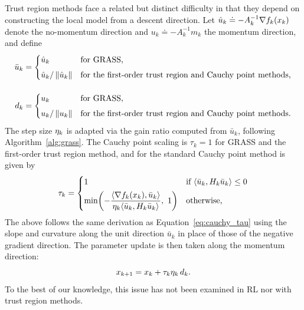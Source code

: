 Trust region methods face a related but distinct difficulty in that they depend on constructing the local model from a descent direction. Let $\hat{u}_k \doteq -A_k^{-1} \nabla f_k(x_{k})$ denote the no-momentum direction and $u_k \doteq -A_k^{-1} m_k$ the momentum direction, and define
\begin{equation}
\begin{aligned}
    \bar{u}_k &=
    \begin{cases}
        \hat{u}_k & \text{for GRASS,} \\[4pt]
        \hat{u}_k / \left \lVert \hat{u}_k \right \rVert & \text{for the first-order trust region and Cauchy point methods,}
    \end{cases} \\[10pt]
    d_k &=
    \begin{cases}
        u_k & \text{for GRASS,} \\[4pt]
        u_k / \left \lVert u_k \right \rVert & \text{for the first-order trust region and Cauchy point methods.}
    \end{cases}
\end{aligned}
\end{equation}
The step size $\eta_{k}$ is adapted via the gain ratio computed from $\bar{u}_k$, following Algorithm~\ref{alg:grass}. The Cauchy point scaling is $\tau_k = 1$ for GRASS and the first-order trust region method, and for the standard Cauchy point method is given by
\begin{equation}
    \tau_k =
    \begin{cases}
        1 & \text{if } \langle \bar{u}_k, H_k \bar{u}_k \rangle \le 0 \\[4pt]
        \min\!\left( -\dfrac{\langle \nabla f_k(x_{k}), \bar{u}_k \rangle}{\eta_{k} \langle \bar{u}_k, H_k \bar{u}_k \rangle},\ 1 \right) & \text{otherwise,}
    \end{cases}
    \label{eq:cauchy_tau_momentum}
\end{equation}
The above follows the same derivation as Equation~\eqref{eq:cauchy_tau} using the slope and curvature along the unit direction $\bar{u}_k$ in place of those of the negative gradient direction. The parameter update is then taken along the momentum direction:
\begin{equation}
    x_{k+1} = x_{k} + \tau_k \eta_{k}\, d_k.
    \label{eq:tr_momentum_update}
\end{equation}
To the best of our knowledge, this issue has not been examined in RL nor with trust region methods.
\FloatBarrier
